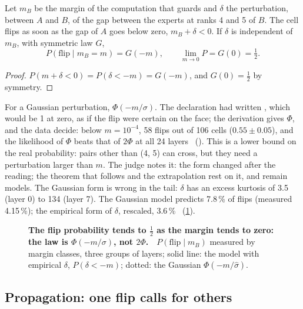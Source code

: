 \begin{proposition}\label{t3tro:prop:bascule}
Let $m_B$ be the margin of the computation that guards and $\delta$ the perturbation, between $A$ and $B$, of the gap between the experts at ranks 4 and 5 of $B$. The cell flips as soon as the gap of $A$ goes below zero, $m_B + \delta < 0$. If $\delta$ is independent of $m_B$, with symmetric law $G$,
\begin{equation}\label{t3tro:eq:bascule}
P(\text{flip} \mid m_B = m) = G(-m), \qquad \lim_{m \to 0} P = G(0) = \tfrac12 .
\end{equation}
\end{proposition}
\begin{proof}
$P(m + \delta < 0) = P(\delta < -m) = G(-m)$, and $G(0) = \tfrac12$ by symmetry.
\end{proof}
For a Gaussian perturbation, $\Phi(-m/\sigma)$. The declaration had written , which would be 1 at zero, as if the flip were certain on the face; the derivation gives $\Phi$, and the data decide: below $m = 10^{-4}$, 58 flips out of 106 cells ($0.55 \pm 0.05$), and the likelihood of $\Phi$ beats that of $2\Phi$ at all 24 layers \mes~(). This is a lower bound on the real probability: pairs other than (4, 5) can cross, but they need a perturbation larger than $m$. The judge notes it: the form changed after the reading; the theorem that follows and the extrapolation rest on it, and remain models. The Gaussian form is wrong in the tail: $\delta$ has an excess kurtosis of 3.5 (layer 0) to 134 (layer 7). The Gaussian model predicts 7.8\,\% of flips (measured 4.15\,\%); the empirical form of $\delta$, rescaled, 3.6\,\% \calc~(\cref{fig:t3-trop-loi-bascule}).

\begin{figure}[tbp]
\centering
\GrapheTropicaleLoiBascule
\caption[The flip law]{\textbf{The flip probability tends to $\tfrac12$ as the margin tends to zero: the law is $\Phi(-m/\sigma)$, not $2\Phi$.} \mes\,\calc~$P(\text{flip} \mid m_B)$ measured by margin classes, three groups of layers; solid line: the model with empirical $\delta$, $P(\delta < -m)$; dotted: the Gaussian $\Phi(-m/\hat\sigma)$. }
\label{fig:t3-trop-loi-bascule}
\end{figure}

\subsection{Propagation: one flip calls for others}\label{t3tro:sec:propagation}

